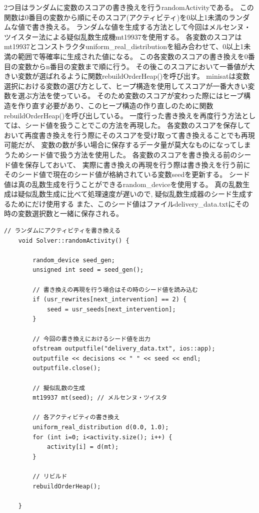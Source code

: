 2つ目はランダムに変数のスコアの書き換えを行うrandomActivityである。
この関数は0番目の変数から順にそのスコア(アクティビティ)を0以上1未満のランダムな値で書き換える。
ランダムな値を生成する方法として今回はメルセンヌ・ツイスター法による疑似乱数生成機mt19937を使用する。
各変数のスコアはmt19937とコンストラクタuniform\_real\_distributionを組み合わせて、0以上1未満の範囲で等確率に生成された値になる。
この各変数のスコアの書き換えを0番目の変数からn番目の変数まで順に行う。
その後このスコアにおいて一番値が大きい変数が選ばれるように関数rebuildOrderHeap()を呼び出す。
minisatは変数選択における変数の選び方として、ヒープ構造を使用してスコアが一番大きい変数を選ぶ方法を使っている。
そのため変数のスコアが変わった際にはヒープ構造を作り直す必要があり、このヒープ構造の作り直しのために関数rebuildOrderHeap()を呼び出している。
一度行った書き換えを再度行う方法としては、シード値を扱うことでこの方法を再現した。
各変数のスコアを保存しておいて再度書き換えを行う際にそのスコアを受け取って書き換えることでも再現可能だが、
変数の数が多い場合に保存するデータ量が莫大なものになってしまうためシード値で扱う方法を使用した。
各変数のスコアを書き換える前のシード値を保存しておいて、
実際に書き換えの再現を行う際は書き換えを行う前にそのシード値で現在のシード値が格納されている変数seedを更新する。
シード値は真の乱数生成を行うことができるrandom\_deviceを使用する。
真の乱数生成は疑似乱数生成に比べて処理速度が遅いので, 疑似乱数生成器のシード生成するためにだけ使用する
また、このシード値はファイルdelivery\_data.txtにその時の変数選択数と一緒に保存される。
\begin{lstlisting}[caption=関数randomActivity(core/Solver.cc)]
	// ランダムにアクティビティを書き換える
	void Solver::randomActivity() {

    	random_device seed_gen;
    	unsigned int seed = seed_gen();

		// 書き換えの再現を行う場合はその時のシード値を読み込む
    	if (usr_rewrites[next_intervention] == 2) {
    	    seed = usr_seeds[next_intervention];
    	}

		// 今回の書き換えにおけるシード値を出力
    	ofstream outputfile("delivery_data.txt", ios::app);
    	outputfile << decisions << " " << seed << endl;
    	outputfile.close();

    	// 擬似乱数の生成
    	mt19937 mt(seed); // メルセンヌ・ツイスタ

    	// 各アクティビティの書き換え
    	uniform_real_distribution d(0.0, 1.0);
    	for (int i=0; i<activity.size(); i++) {
    	    activity[i] = d(mt);
    	}
    
    	// リビルド
    	rebuildOrderHeap();

	}
\end{lstlisting}

